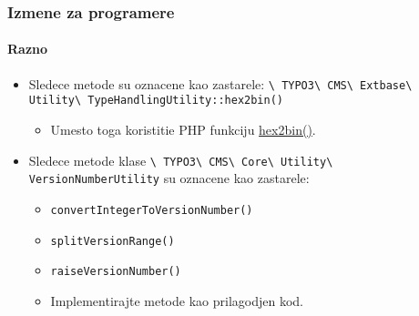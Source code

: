 \begin{frame}[fragile]
	\frametitle{Izmene za programere}
	\framesubtitle{Razno}

	\begin{itemize}

		\item Sledece metode su oznacene kao zastarele:\newline
			\smaller\texttt{\textbackslash
				TYPO3\textbackslash
				CMS\textbackslash
				Extbase\textbackslash
				Utility\textbackslash
				TypeHandlingUtility::hex2bin()}\normalsize

			\begin{itemize}\smaller
				\item[\ding{228}] Umesto toga koristitie PHP funkciju \href{https://www.php.net/manual/en/function.hex2bin.php}{hex2bin()}.
			\end{itemize}\normalsize

		\item Sledece metode klase
			\smaller\texttt{\textbackslash
				TYPO3\textbackslash
				CMS\textbackslash
				Core\textbackslash
				Utility\textbackslash
				VersionNumberUtility}\normalsize\newline
			su oznacene kao zastarele:

			\begin{itemize}
				\item \texttt{convertIntegerToVersionNumber()}
				\item \texttt{splitVersionRange()}
				\item \texttt{raiseVersionNumber()}
			\end{itemize}

			\begin{itemize}\smaller
				\item[\ding{228}] Implementirajte metode kao prilagodjen kod.
			\end{itemize}\normalsize

	\end{itemize}

\end{frame}


